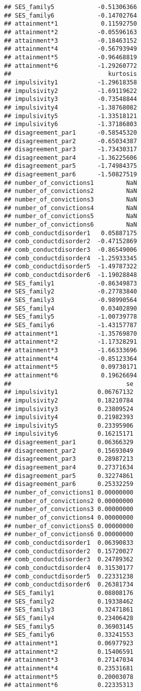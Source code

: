 \documentclass[]{tufte-handout}
\begin{document}
\begin{verbatim}
## SES_family5            -0.51306366
## SES_family6            -0.14702764
## attainment*1            0.11592750
## attainment*2           -0.05596163
## attainment*3           -0.18463152
## attainment*4           -0.56793949
## attainment*5           -0.96468819
## attainment*6           -1.29260772
##                           kurtosis
## impulsivity1           -1.29618358
## impulsivity2           -1.69119622
## impulsivity3           -0.73548844
## impulsivity4           -1.38768082
## impulsivity5           -1.33518121
## impulsivity6           -1.37186803
## disagreement_par1      -0.58545320
## disagreement_par2      -0.65034387
## disagreement_par3      -1.73430317
## disagreement_par4      -1.36225606
## disagreement_par5      -1.74984375
## disagreement_par6      -1.50827519
## number_of_convictions1         NaN
## number_of_convictions2         NaN
## number_of_convictions3         NaN
## number_of_convictions4         NaN
## number_of_convictions5         NaN
## number_of_convictions6         NaN
## comb_conductdisorder1   0.05887175
## comb_conductdisorder2  -0.47152869
## comb_conductdisorder3  -0.86549006
## comb_conductdisorder4  -1.25933345
## comb_conductdisorder5  -1.49787322
## comb_conductdisorder6  -1.19028848
## SES_family1            -0.86349873
## SES_family2            -0.27783840
## SES_family3            -0.98990564
## SES_family4             0.03402890
## SES_family5            -1.00739778
## SES_family6            -1.43157787
## attainment*1           -1.35769870
## attainment*2           -1.17328291
## attainment*3           -1.66333696
## attainment*4           -0.85123364
## attainment*5            0.09730171
## attainment*6            0.19626694
##                                se
## impulsivity1           0.06767132
## impulsivity2           0.18210784
## impulsivity3           0.23809524
## impulsivity4           0.21982393
## impulsivity5           0.23395906
## impulsivity6           0.16215171
## disagreement_par1      0.06366329
## disagreement_par2      0.15693049
## disagreement_par3      0.28987213
## disagreement_par4      0.27371634
## disagreement_par5      0.32274861
## disagreement_par6      0.25332259
## number_of_convictions1 0.00000000
## number_of_convictions2 0.00000000
## number_of_convictions3 0.00000000
## number_of_convictions4 0.00000000
## number_of_convictions5 0.00000000
## number_of_convictions6 0.00000000
## comb_conductdisorder1  0.06390833
## comb_conductdisorder2  0.15720027
## comb_conductdisorder3  0.24789362
## comb_conductdisorder4  0.31530177
## comb_conductdisorder5  0.22331238
## comb_conductdisorder6  0.26381734
## SES_family1            0.08808176
## SES_family2            0.19338462
## SES_family3            0.32471861
## SES_family4            0.23406428
## SES_family5            0.36903145
## SES_family6            0.33241553
## attainment*1           0.06977923
## attainment*2           0.15406591
## attainment*3           0.27147034
## attainment*4           0.23531681
## attainment*5           0.20003078
## attainment*6           0.22335313
\end{verbatim}
\end{document}
